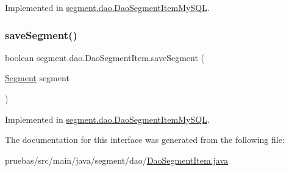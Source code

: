 Implemented in \mbox{\hyperlink{classsegment_1_1dao_1_1_dao_segment_item_my_s_q_l_aa448b5ac94351b927a9b8b4da988d55a}{segment.\+dao.\+Dao\+Segment\+Item\+My\+S\+QL}}.

\mbox{\label{interfacesegment_1_1dao_1_1_dao_segment_item_a1535dcb8477f7ab96c81041d8c86ba35}} 
\subsubsection{\texorpdfstring{save\+Segment()}{saveSegment()}}
{\footnotesize\ttfamily boolean segment.\+dao.\+Dao\+Segment\+Item.\+save\+Segment (\begin{DoxyParamCaption}\item[{\mbox{\hyperlink{classclases_1_1_segment}{Segment}}}]{segment }\end{DoxyParamCaption})}



Implemented in \mbox{\hyperlink{classsegment_1_1dao_1_1_dao_segment_item_my_s_q_l_a094dab67038c9f56c9bafc9a596109dc}{segment.\+dao.\+Dao\+Segment\+Item\+My\+S\+QL}}.



The documentation for this interface was generated from the following file\+:\begin{DoxyCompactItemize}
\item 
pruebas/src/main/java/segment/dao/\mbox{\hyperlink{_dao_segment_item_8java}{Dao\+Segment\+Item.\+java}}\end{DoxyCompactItemize}
